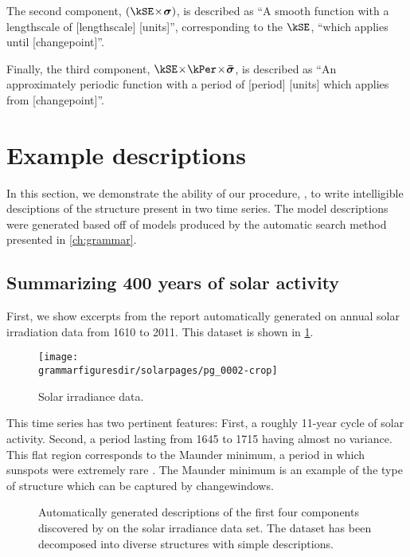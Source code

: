 The second component, $(\kSE \kerntimes \vsigma)$, is described as ``A smooth function with a lengthscale of [lengthscale] [units]'', corresponding to the $\kSE$, ``which applies until [changepoint]''.

Finally, the third component, $\kSE \kerntimes \kPer \kerntimes \boldsymbol{\bar\sigma}$, is described as ``An approximately periodic function with a period of [period] [units] which applies from [changepoint]''.






\section{Example descriptions}
\label{sec:example-descriptions}
In this section, we demonstrate the ability of our procedure, \procedurename, to write intelligible desciptions of the structure present in two time series.
The model descriptions were generated based off of models produced by the automatic search method presented in \cref{ch:grammar}.


\subsection{Summarizing 400 years of solar activity}
\label{sec:solar}

First, we show excerpts from the report automatically generated on annual solar irradiation data from 1610 to 2011.
This dataset is shown in \cref{fig:solar}.
%
\begin{figure}[ht!]
\centering
\texttt{[image: \\grammarfiguresdir/solarpages/pg\_0002-crop]}
\caption[Solar irradiance dataset]
{Solar irradiance data.}
\label{fig:solar}
\end{figure}

This time series has two pertinent features: 
First, a roughly 11-year cycle of solar activity.
Second, a period lasting from 1645 to 1715 having almost no variance.
This flat region corresponds to the Maunder minimum, a period in which sunspots were extremely rare \citep{lean1995reconstruction}.
The Maunder minimum is an example of the type of structure which can be captured by changewindows.

\begin{figure}[ht!]
\centering
{}
\caption[Automatically-generated descriptions of the solar irradiance data set]
{Automatically generated descriptions of the first four components discovered by \procedurename{} on the solar irradiance data set.
The dataset has been decomposed into diverse structures with simple descriptions.}
\label{fig:exec}
\end{figure}

